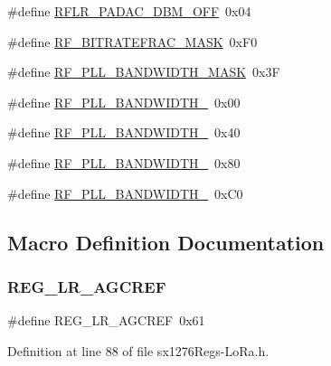 \begin{DoxyCompactItemize}
\#define \mbox{\hyperlink{sx1276_regs-_lo_ra_8h_a16791519b3052ba77fcc3bd3b1112fa2}{R\+F\+L\+R\+\_\+\+P\+A\+D\+A\+C\+\_\+D\+B\+M\+\_\+\+O\+FF}}~0x04
\item 
\#define \mbox{\hyperlink{sx1276_regs-_lo_ra_8h_a15a3a7765ab924197cdf57cbe3fc1160}{R\+F\+\_\+\+B\+I\+T\+R\+A\+T\+E\+F\+R\+A\+C\+\_\+\+M\+A\+SK}}~0x\+F0
\item 
\#define \mbox{\hyperlink{sx1276_regs-_lo_ra_8h_aac01efdf312f6264cbd8b48d6c94e0ea}{R\+F\+\_\+\+P\+L\+L\+\_\+\+B\+A\+N\+D\+W\+I\+D\+T\+H\+\_\+\+M\+A\+SK}}~0x3F
\item 
\#define \mbox{\hyperlink{sx1276_regs-_lo_ra_8h_afdfab4acc3525e87ce252cbf593c3255}{R\+F\+\_\+\+P\+L\+L\+\_\+\+B\+A\+N\+D\+W\+I\+D\+T\+H\+\_}}~0x00
\item 
\#define \mbox{\hyperlink{sx1276_regs-_lo_ra_8h_acb5d72344cac01094235aaf62ac05399}{R\+F\+\_\+\+P\+L\+L\+\_\+\+B\+A\+N\+D\+W\+I\+D\+T\+H\+\_}}~0x40
\item 
\#define \mbox{\hyperlink{sx1276_regs-_lo_ra_8h_aa5f41821cba4e1c23b0cf8b6eb05d021}{R\+F\+\_\+\+P\+L\+L\+\_\+\+B\+A\+N\+D\+W\+I\+D\+T\+H\+\_}}~0x80
\item 
\#define \mbox{\hyperlink{sx1276_regs-_lo_ra_8h_ae1e12342489e52885c9de6812079d6e8}{R\+F\+\_\+\+P\+L\+L\+\_\+\+B\+A\+N\+D\+W\+I\+D\+T\+H\+\_}}~0x\+C0
\end{DoxyCompactItemize}


\subsection{Macro Definition Documentation}
\mbox{\label{sx1276_regs-_lo_ra_8h_a3ad00cd303907ff68744172e6bf219c8}} 
\subsubsection{\texorpdfstring{R\+E\+G\+\_\+\+L\+R\+\_\+\+A\+G\+C\+R\+EF}{REG\_LR\_AGCREF}}
{\footnotesize\ttfamily \#define R\+E\+G\+\_\+\+L\+R\+\_\+\+A\+G\+C\+R\+EF~0x61}



Definition at line 88 of file sx1276\+Regs-\/\+Lo\+Ra.\+h.

